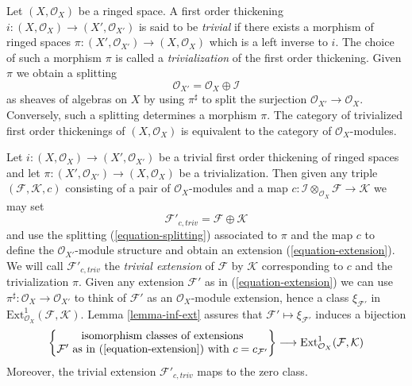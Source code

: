 \begin{remark}
\label{remark-trivial-thickening}
Let $(X, \mathcal{O}_X)$ be a ringed space. A first order thickening
$i : (X, \mathcal{O}_X) \to (X', \mathcal{O}_{X'})$ is said
to be {\it trivial} if there exists a morphism of ringed spaces
$\pi : (X', \mathcal{O}_{X'}) \to (X, \mathcal{O}_X)$ which is a
left inverse to $i$. The choice of such a morphism
$\pi$ is called a {\it trivialization} of the first order thickening.
Given $\pi$ we obtain a splitting
\begin{equation}
\label{equation-splitting}
\mathcal{O}_{X'} = \mathcal{O}_X \oplus \mathcal{I}
\end{equation}
as sheaves of algebras on $X$ by using $\pi^\sharp$ to split the surjection
$\mathcal{O}_{X'} \to \mathcal{O}_X$. Conversely, such a splitting determines
a morphism $\pi$. The category of trivialized first order thickenings of
$(X, \mathcal{O}_X)$ is equivalent to the category of 
$\mathcal{O}_X$-modules.
\end{remark}

\begin{remark}
\label{remark-trivial-extension}
Let $i : (X, \mathcal{O}_X) \to (X', \mathcal{O}_{X'})$
be a trivial first order thickening of ringed spaces
and let $\pi : (X', \mathcal{O}_{X'}) \to (X, \mathcal{O}_X)$
be a trivialization. Then given any triple
$(\mathcal{F}, \mathcal{K}, c)$ consisting of a pair of
$\mathcal{O}_X$-modules and a map
$c : \mathcal{I} \otimes_{\mathcal{O}_X} \mathcal{F} \to \mathcal{K}$
we may set
$$
\mathcal{F}'_{c, triv} = \mathcal{F} \oplus \mathcal{K}
$$
and use the splitting (\ref{equation-splitting}) associated to $\pi$
and the map $c$ to define the $\mathcal{O}_{X'}$-module structure
and obtain an extension (\ref{equation-extension}). We will call
$\mathcal{F}'_{c, triv}$ the {\it trivial extension} of $\mathcal{F}$
by $\mathcal{K}$ corresponding
to $c$ and the trivialization $\pi$. Given any extension
$\mathcal{F}'$ as in (\ref{equation-extension}) we can use
$\pi^\sharp : \mathcal{O}_X \to \mathcal{O}_{X'}$ to think of $\mathcal{F}'$
as an $\mathcal{O}_X$-module extension, hence a class $\xi_{\mathcal{F}'}$
in $\text{Ext}^1_{\mathcal{O}_X}(\mathcal{F}, \mathcal{K})$.
Lemma \ref{lemma-inf-ext} assures that
$\mathcal{F}' \mapsto \xi_{\mathcal{F}'}$
induces a bijection
$$
\left\{
\begin{matrix}
\text{isomorphism classes of extensions}\\
\mathcal{F}'\text{ as in (\ref{equation-extension}) with }c = c_{\mathcal{F}'}
\end{matrix}
\right\}
\longrightarrow
\text{Ext}^1_{\mathcal{O}_X}(\mathcal{F}, \mathcal{K})
$$
Moreover, the trivial extension $\mathcal{F}'_{c, triv}$ maps to the zero class.
\end{remark}

